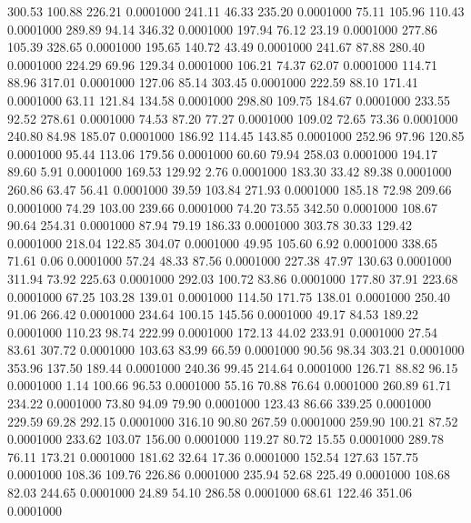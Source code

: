  300.53  100.88  226.21   0.0001000
 241.11   46.33  235.20   0.0001000
  75.11  105.96  110.43   0.0001000
 289.89   94.14  346.32   0.0001000
 197.94   76.12   23.19   0.0001000
 277.86  105.39  328.65   0.0001000
 195.65  140.72   43.49   0.0001000
 241.67   87.88  280.40   0.0001000
 224.29   69.96  129.34   0.0001000
 106.21   74.37   62.07   0.0001000
 114.71   88.96  317.01   0.0001000
 127.06   85.14  303.45   0.0001000
 222.59   88.10  171.41   0.0001000
  63.11  121.84  134.58   0.0001000
 298.80  109.75  184.67   0.0001000
 233.55   92.52  278.61   0.0001000
  74.53   87.20   77.27   0.0001000
 109.02   72.65   73.36   0.0001000
 240.80   84.98  185.07   0.0001000
 186.92  114.45  143.85   0.0001000
 252.96   97.96  120.85   0.0001000
  95.44  113.06  179.56   0.0001000
  60.60   79.94  258.03   0.0001000
 194.17   89.60    5.91   0.0001000
 169.53  129.92    2.76   0.0001000
 183.30   33.42   89.38   0.0001000
 260.86   63.47   56.41   0.0001000
  39.59  103.84  271.93   0.0001000
 185.18   72.98  209.66   0.0001000
  74.29  103.00  239.66   0.0001000
  74.20   73.55  342.50   0.0001000
 108.67   90.64  254.31   0.0001000
  87.94   79.19  186.33   0.0001000
 303.78   30.33  129.42   0.0001000
 218.04  122.85  304.07   0.0001000
  49.95  105.60    6.92   0.0001000
 338.65   71.61    0.06   0.0001000
  57.24   48.33   87.56   0.0001000
 227.38   47.97  130.63   0.0001000
 311.94   73.92  225.63   0.0001000
 292.03  100.72   83.86   0.0001000
 177.80   37.91  223.68   0.0001000
  67.25  103.28  139.01   0.0001000
 114.50  171.75  138.01   0.0001000
 250.40   91.06  266.42   0.0001000
 234.64  100.15  145.56   0.0001000
  49.17   84.53  189.22   0.0001000
 110.23   98.74  222.99   0.0001000
 172.13   44.02  233.91   0.0001000
  27.54   83.61  307.72   0.0001000
 103.63   83.99   66.59   0.0001000
  90.56   98.34  303.21   0.0001000
 353.96  137.50  189.44   0.0001000
 240.36   99.45  214.64   0.0001000
 126.71   88.82   96.15   0.0001000
   1.14  100.66   96.53   0.0001000
  55.16   70.88   76.64   0.0001000
 260.89   61.71  234.22   0.0001000
  73.80   94.09   79.90   0.0001000
 123.43   86.66  339.25   0.0001000
 229.59   69.28  292.15   0.0001000
 316.10   90.80  267.59   0.0001000
 259.90  100.21   87.52   0.0001000
 233.62  103.07  156.00   0.0001000
 119.27   80.72   15.55   0.0001000
 289.78   76.11  173.21   0.0001000
 181.62   32.64   17.36   0.0001000
 152.54  127.63  157.75   0.0001000
 108.36  109.76  226.86   0.0001000
 235.94   52.68  225.49   0.0001000
 108.68   82.03  244.65   0.0001000
  24.89   54.10  286.58   0.0001000
  68.61  122.46  351.06   0.0001000
